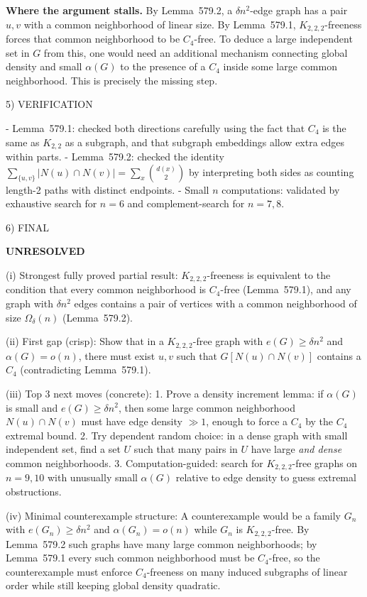 \medskip
\textbf{Where the argument stalls.}
By Lemma~579.2, a $\delta n^2$-edge graph has a pair $u,v$ with a common neighborhood of linear size.
By Lemma~579.1, $K_{2,2,2}$-freeness forces that common neighborhood to be $C_4$-free.
To deduce a large independent set in $G$ from this, one would need an additional mechanism connecting global density and small $\alpha(G)$ to the presence of a $C_4$ inside some large common neighborhood.
This is precisely the missing step.

5) VERIFICATION

- Lemma~579.1: checked both directions carefully using the fact that $C_4$ is the same as $K_{2,2}$ as a subgraph, and that subgraph embeddings allow extra edges within parts.
- Lemma~579.2: checked the identity $\sum_{\{u,v\}}|N(u)\cap N(v)|=\sum_x \binom{d(x)}{2}$ by interpreting both sides as counting length-2 paths with distinct endpoints.
- Small $n$ computations: validated by exhaustive search for $n=6$ and complement-search for $n=7,8$.

6) FINAL

\textbf{UNRESOLVED}

(i) Strongest fully proved partial result:  
$K_{2,2,2}$-freeness is equivalent to the condition that every common neighborhood is $C_4$-free (Lemma~579.1), and any graph with $\delta n^2$ edges contains a pair of vertices with a common neighborhood of size $\Omega_\delta(n)$ (Lemma~579.2).

(ii) First gap (crisp):  
Show that in a $K_{2,2,2}$-free graph with $e(G)\ge \delta n^2$ and $\alpha(G)=o(n)$, there must exist $u,v$ such that $G[N(u)\cap N(v)]$ contains a $C_4$ (contradicting Lemma~579.1).

(iii) Top 3 next moves (concrete):
1. Prove a density increment lemma: if $\alpha(G)$ is small and $e(G)\ge \delta n^2$, then some large common neighborhood $N(u)\cap N(v)$ must have edge density $\gg 1$, enough to force a $C_4$ by the $C_4$ extremal bound.
2. Try dependent random choice: in a dense graph with small independent set, find a set $U$ such that many pairs in $U$ have large \emph{and dense} common neighborhoods.
3. Computation-guided: search for $K_{2,2,2}$-free graphs on $n=9,10$ with unusually small $\alpha(G)$ relative to edge density to guess extremal obstructions.

(iv) Minimal counterexample structure:  
A counterexample would be a family $G_n$ with $e(G_n)\ge \delta n^2$ and $\alpha(G_n)=o(n)$ while $G_n$ is $K_{2,2,2}$-free.
By Lemma~579.2 such graphs have many large common neighborhoods; by Lemma~579.1 every such common neighborhood must be $C_4$-free, so the counterexample must enforce $C_4$-freeness on many induced subgraphs of linear order while still keeping global density quadratic.

